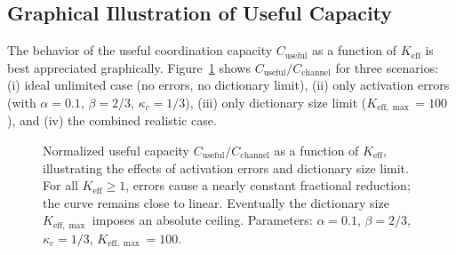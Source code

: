 \documentclass[12pt,a4paper]{article}
\theoremstyle{remark}
\newcommand{\Keff}{K_{\mathrm{eff}}}
\newcommand{\kappac}{\kappa_c}
\newcommand{\Keffmax}{K_{\mathrm{eff},\max}}
\begin{document}
	\subsection{Graphical Illustration of Useful Capacity}
	\label{sec:graphical}
	
	The behavior of the useful coordination capacity $C_{\text{useful}}$ as a function of $\Keff$ is best appreciated graphically. Figure~\ref{fig:useful-capacity} shows $C_{\text{useful}}/C_{\text{channel}}$ for three scenarios: (i) ideal unlimited case (no errors, no dictionary limit), (ii) only activation errors (with $\alpha=0.1$, $\beta=2/3$, $\kappa_c=1/3$), (iii) only dictionary size limit ($\Keffmax=100$), and (iv) the combined realistic case.
	
	\begin{figure}[htbp]
		\centering
		\caption{Normalized useful capacity $C_{\text{useful}}/C_{\text{channel}}$ as a function of $\Keff$, illustrating the effects of activation errors and dictionary size limit. For all $K_{\mathrm{eff}} \ge 1$, errors cause a nearly constant fractional reduction; the curve remains close to linear. Eventually the dictionary size $\Keffmax$ imposes an absolute ceiling. Parameters: $\alpha=0.1$, $\beta=2/3$, $\kappa_c=1/3$, $\Keffmax=100$.}
		\label{fig:useful-capacity}
	\end{figure}
	
\end{document}
